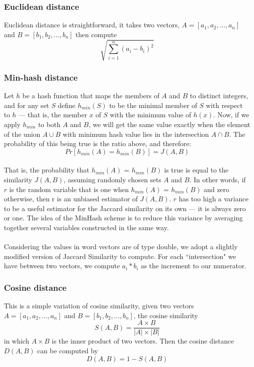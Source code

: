 \documentclass[12pt]{article}
\begin{document}
\subsubsection*{Euclidean distance}
Euclidean distance is straightforward, it takes two vectors, $A=[a_1, a_2, ..., a_n]$ and $B=[b_1, b_2, ..., b_n]$ then compute $$\sqrt{\sum_{i=1}^n(a_i-b_i)^2}$$
\subsubsection*{Min-hash distance}
Let $h$ be a hash function that maps the members of $A$ and $B$ to distinct integers, and for any set $S$ define $h_{min}(S)$ to be the minimal member of $S$ with respect to $h$ — that is, the member $x$ of $S$ with the minimum value of $h(x)$. Now, if we apply $h_{min}$ to both $A$ and $B$, we will get the same value exactly when the element of the union $A\cup B$ with minimum hash value lies in the intersection $A\cap B$. The probability of this being true is the ratio above, and therefore:
$$Pr[ h_{min}(A) = h_{min}(B) ] = J(A,B)$$
\\
That is, the probability that $h_{min}(A)$ = $h_{min}(B)$ is true is equal to the similarity $J(A,B)$, assuming randomly chosen sets $A$ and $B$. In other words, if $r$ is the random variable that is one when $h_{min}(A)$ = $h_{min}(B)$ and zero otherwise, then r is an unbiased estimator of $J(A,B)$. $r$ has too high a variance to be a useful estimator for the Jaccard similarity on its own — it is always zero or one. The idea of the MinHash scheme is to reduce this variance by averaging together several variables constructed in the same way.\\
\\
Considering the values in word vectors are of type double, we adopt a slightly modified version of Jaccard Similarity to compute. For each ``intersection" we have between two vectors, we compute $a_i * b_i$ as the increment to our numerator.
\subsubsection*{Cosine distance}
This is a simple variation of cosine similarity, given two vectors $A=[a_1, a_2, ..., a_n]$ and $B=[b_1, b_2, ..., b_n]$, the cosine similarity $$S(A,B)=\frac{A\times B}{|A|\times|B|}$$
in which $A\times B$ is the inner product of two vectors. Then the cosine distance $D(A,B)$ can be computed by $$D(A,B) = 1-S(A,B)$$
\end{document}
